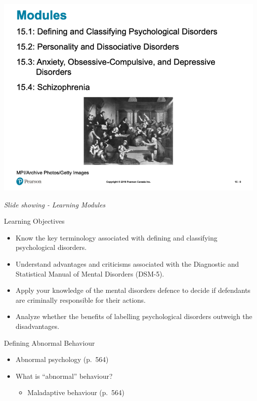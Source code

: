\documentclass[
]{book}
\providecommand{\tightlist}{%
  \setlength{\itemsep}{0pt}\setlength{\parskip}{0pt}}
\begin{document}
\begin{reflect}
\includegraphics{assets/unit_10/slide_8.png}

\emph{Slide showing - Learning Modules}

Learning Objectives

\begin{itemize}
\tightlist
\item
  Know the key terminology associated with defining and classifying psychological disorders.\\
\item
  Understand advantages and criticisms associated with the Diagnostic and Statistical Manual of Mental Disorders (DSM-5).\\
\item
  Apply your knowledge of the mental disorders defence to decide if defendants are criminally responsible for their actions.\\
\item
  Analyze whether the benefits of labelling psychological disorders outweigh the disadvantages.
\end{itemize}

Defining Abnormal Behaviour

\begin{itemize}
\tightlist
\item
  Abnormal psychology (p.~564)\\
\item
  What is ``abnormal'' behaviour?

  \begin{itemize}
  \tightlist
  \item
    Maladaptive behaviour (p.~564)
  \end{itemize}
\end{itemize}


\end{reflect}
\end{document}
